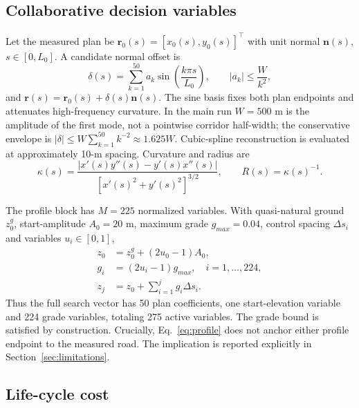 \documentclass[preprint,12pt]{elsarticle}
\begin{document}
\subsection{Collaborative decision variables}

Let the measured plan be $\bm r_0(s)=[x_0(s),y_0(s)]^\top$ with unit normal $\bm n(s)$, $s\in[0,L_0]$. A candidate normal offset is
\begin{equation}
\delta(s)=\sum_{k=1}^{50}a_k\sin\left(\frac{k\pi s}{L_0}\right),
\qquad |a_k|\leq \frac{W}{k^2},
\label{eq:sine}
\end{equation}
and $\bm r(s)=\bm r_0(s)+\delta(s)\bm n(s)$. The sine basis fixes both plan endpoints and attenuates high-frequency curvature. In the main run $W=500$ m is the amplitude of the first mode, not a pointwise corridor half-width; the conservative envelope is $|\delta|\leq W\sum_{k=1}^{50}k^{-2}\approx1.625W$. Cubic-spline reconstruction is evaluated at approximately 10-m spacing. Curvature and radius are
\begin{equation}
\kappa(s)=\frac{|x'(s)y''(s)-y'(s)x''(s)|}
{[x'(s)^2+y'(s)^2]^{3/2}},\qquad R(s)=\kappa(s)^{-1}.
\label{eq:curvature}
\end{equation}

The profile block has $M=225$ normalized variables. With quasi-natural ground $z^g_0$, start-amplitude $A_0=20$ m, maximum grade $g_{max}=0.04$, control spacing $\Delta s_i$ and variables $u_i\in[0,1]$,
\begin{align}
z_0&=z^g_0+(2u_0-1)A_0,\\
g_i&=(2u_i-1)g_{max},\quad i=1,\ldots,224,\\
z_j&=z_0+\sum_{i=1}^{j}g_i\Delta s_i.
\label{eq:profile}
\end{align}
Thus the full search vector has 50 plan coefficients, one start-elevation variable and 224 grade variables, totaling 275 active variables. The grade bound is satisfied by construction. Crucially, Eq.~\eqref{eq:profile} does not anchor either profile endpoint to the measured road. The implication is reported explicitly in Section~\ref{sec:limitations}.

\subsection{Life-cycle cost}
\end{document}
